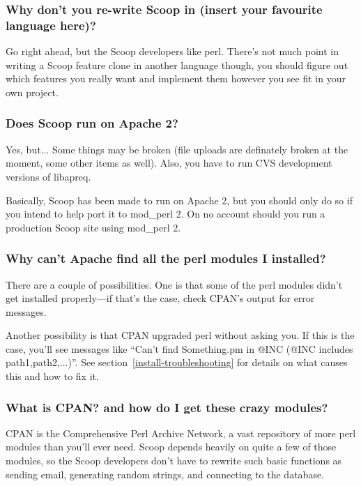 \subsubsection{Why don't you re-write Scoop in (insert your favourite language here)?}

Go right ahead, but the Scoop developers like perl. There's not much point in writing a Scoop feature clone in another language though, you should figure out which features you really want and implement them however you see fit in your own project.

\subsubsection{Does Scoop run on Apache 2?}

Yes, but...  Some things may be broken (file uploads are definately broken at the moment, some other items as well). Also, you have to run CVS development versions of libapreq. 

Basically, Scoop has been made to run on Apache 2, but you should only do so if you intend to help port it to mod\_perl 2. On no account should you run a production Scoop site using mod\_perl 2.

\subsubsection{Why can't Apache find all the perl modules I installed?}

There are a couple of possibilities. One is that some of the perl modules didn't get installed properly---if that's the case, check CPAN's output for error messages.

Another possibility is that CPAN upgraded perl without asking you. If this is the case, you'll see messages like ``Can't find Something.pm in @INC (@INC includes path1,path2,...)''. See section~\ref{install-troubleshooting} for details on what causes this and how to fix it.

\subsubsection{What is CPAN? and how do I get these crazy modules?}

CPAN is the Comprehensive Perl Archive Network, a vast repository of more perl modules than you'll ever need. Scoop depends heavily on quite a few of those modules, so the Scoop developers don't have to rewrite such basic functions as sending email, generating random strings, and connecting to the database.

